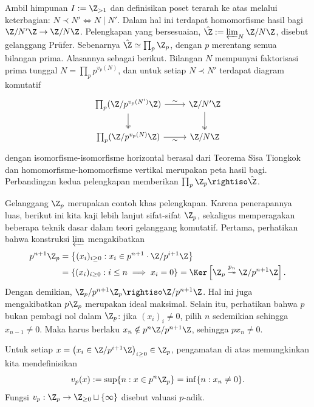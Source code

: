 \begin{example}\label{eg:Prüfer}
	Ambil himpunan $I := \Z_{> 1}$ dan definisikan poset terarah ke atas melalui keterbagian: $N \prec N' \iff N \mid N'$. Dalam hal ini terdapat homomorfisme hasil bagi $\Z/N'\Z \to \Z/N\Z$. Pelengkapan yang bersesuaian, $\hat{\Z} := \varprojlim_N \Z/N\Z$, disebut gelanggang Prüfer. Sebenarnya $\hat{\Z} \simeq \prod_p \Z_p$, dengan $p$ merentang semua bilangan prima. Alasannya sebagai berikut. Bilangan $N$ mempunyai faktorisasi prima tunggal $N = \prod_p p^{v_p(N)}$, dan untuk setiap $N \prec N'$ terdapat diagram komutatif
	\[ \begin{tikzcd}
		\prod_p (\Z/p^{v_p(N')}\Z ) \arrow[twoheadrightarrow, d] \arrow[r, "\sim"] & \Z/N'\Z \arrow[twoheadrightarrow, d] \\
		\prod_p (\Z/p^{v_p(N)}\Z ) \arrow[r, "\sim"'] & \Z/N\Z
	\end{tikzcd} \]
	dengan isomorfisme-isomorfisme horizontal berasal dari Teorema Sisa Tiongkok dan homomorfisme-homomorfisme vertikal merupakan peta hasil bagi. Perbandingan kedua pelengkapan memberikan $\prod_p \Z_p \rightiso \hat{\Z}$.
\end{example}

Gelanggang $\Z_p$ merupakan contoh khas pelengkapan. Karena penerapannya luas, berikut ini kita kaji lebih lanjut sifat-sifat $\Z_p$, sekaligus memperagakan beberapa teknik dasar dalam teori gelanggang komutatif. Pertama, perhatikan bahwa konstruksi $\varprojlim$ mengakibatkan
\begin{align*}
	p^{n+1} \Z_p & = \left\{ (x_i)_{i \geq 0} : x_i \in p^{n+1} \cdot \Z/p^{i+1}\Z \right\} \\
	& = \left\{ (x_i)_{i \geq 0} : i \leq n \implies x_i=0 \right\} = \Ker\left[ \Z_p \stackrel{p_n}{\twoheadrightarrow} \Z/p^{n+1}\Z \right].
\end{align*}
Dengan demikian, $\Z_p/p^{n+1}\Z_p \rightiso \Z/p^{n+1}\Z$. Hal ini juga mengakibatkan $p\Z_p$ merupakan ideal maksimal. Selain itu, perhatikan bahwa $p$ bukan pembagi nol dalam $\Z_p$: jika $(x_i)_i \neq 0$, pilih $n$ sedemikian sehingga $x_{n-1} \neq 0$. Maka harus berlaku $x_n \notin p^n \Z/p^{n+1}\Z$, sehingga $px_n \neq 0$.

Untuk setiap $x = \left( x_i \in \Z/p^{i+1}\Z \right)_{i \geq 0} \in \Z_p$, pengamatan di atas memungkinkan kita mendefinisikan
\[ v_p(x) := \sup\{n: x \in p^n\Z_p \} = \inf\{n : x_n \neq 0\}. \]
Fungsi $v_p: \Z_p  \to \Z_{\geq 0} \sqcup \{\infty\}$ disebut valuasi $p$-adik.

